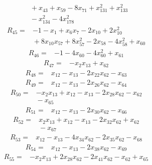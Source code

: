 {\begin{align*}
&{}  + x_{43} + x_{59} - 8x_{71} + x_{131}^{2} + x_{133}^{2} \\
&{}  - x_{134}^{2} - 4x_{178}^{2}
\end{align*}
\begin{align*}
R_{45} ={}& -1 - x_{1} + x_{6} x_{7} - 2x_{10} + 2x_{10}^{2} \\
&{}  + 8x_{10} x_{57} + 8x_{57}^{2} - 2x_{58} - 4x_{58}^{2} + x_{60}
\end{align*}
\begin{align*}
R_{46} ={}& -1 - 4x_{60} - 4x_{60}^{2} + x_{61}
\end{align*}
\begin{align*}
R_{47} ={}& -x_{2} x_{13} + x_{62}
\end{align*}
\begin{align*}
R_{48} ={}& x_{12} - x_{13} - 2x_{22} x_{62} - x_{63}
\end{align*}
\begin{align*}
R_{49} ={}& x_{12} - x_{13} - 2x_{26} x_{62} - x_{64}
\end{align*}
\begin{align*}
R_{50} ={}& -x_{2} x_{13} + x_{12} - x_{13} - 2x_{28} x_{62} - x_{62} \\
&{}  - x_{65}
\end{align*}
\begin{align*}
R_{51} ={}& x_{12} - x_{13} - 2x_{30} x_{62} - x_{66}
\end{align*}
\begin{align*}
R_{52} ={}& x_{2} x_{13} + x_{12} - x_{13} - 2x_{32} x_{62} + x_{62} \\
&{}  - x_{67}
\end{align*}
\begin{align*}
R_{53} ={}& x_{12} - x_{13} - 4x_{34} x_{62} - 2x_{35} x_{62} - x_{68}
\end{align*}
\begin{align*}
R_{54} ={}& x_{12} - x_{13} - 2x_{38} x_{62} - x_{69}
\end{align*}
\begin{align*}
R_{55} ={}& -x_{2} x_{13} + 2x_{28} x_{62} - 2x_{41} x_{62} - x_{62} + x_{65} \\

\end{align*}}
